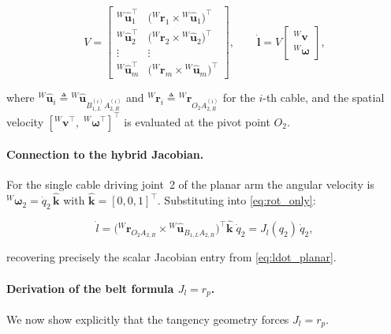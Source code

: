\documentclass[12pt, a4paper]{article}
\theoremstyle{definition}
\begin{document}
\begin{equation}
  \label{eq:structure_matrix}
  \boxed{
  V
  =
  \begin{bmatrix}
    {}^{W}\hat{\mathbf{u}}_1^\top &
    \bigl({}^{W}\mathbf{r}_1 \times {}^{W}\hat{\mathbf{u}}_1\bigr)^\top \\[4pt]
    {}^{W}\hat{\mathbf{u}}_2^\top &
    \bigl({}^{W}\mathbf{r}_2 \times {}^{W}\hat{\mathbf{u}}_2\bigr)^\top \\[2pt]
    \vdots & \vdots \\[2pt]
    {}^{W}\hat{\mathbf{u}}_m^\top &
    \bigl({}^{W}\mathbf{r}_m \times {}^{W}\hat{\mathbf{u}}_m\bigr)^\top
  \end{bmatrix},
  \qquad
  \dot{\mathbf{l}}
  = V
  \begin{bmatrix}
    {}^{W}\mathbf{v} \\ {}^{W}\boldsymbol{\omega}
  \end{bmatrix},
  }
\end{equation}

\noindent
where ${}^{W}\hat{\mathbf{u}}_i \triangleq {}^{W}\hat{\mathbf{u}}_{B_{1,L}^{(i)}A_{2,R}^{(i)}}$
and ${}^{W}\mathbf{r}_i \triangleq {}^{W}\mathbf{r}_{O_2 A_{2,R}^{(i)}}$ for the $i$-th
cable, and the spatial velocity $[{}^{W}\mathbf{v}^\top,\;{}^{W}\boldsymbol{\omega}^\top]^\top$
is evaluated at the pivot point $O_2$.

\paragraph{Connection to the hybrid Jacobian.}
For the single cable driving joint~2 of the planar arm the angular velocity is
${}^{W}\boldsymbol{\omega}_2 = \dot{q}_2\,\hat{\mathbf{k}}$ with
$\hat{\mathbf{k}} = [0,0,1]^\top$.
Substituting into \cref{eq:rot_only}:

\begin{equation}
  \dot{l}
  = \bigl({}^{W}\mathbf{r}_{O_2 A_{2,R}}
          \times {}^{W}\hat{\mathbf{u}}_{B_{1,L}A_{2,R}}\bigr)^\top
    \hat{\mathbf{k}}\;\dot{q}_2
  = J_l(q_2)\,\dot{q}_2 ,
\end{equation}

recovering precisely the scalar Jacobian entry from \cref{eq:ldot_planar}.

\paragraph{Derivation of the belt formula $J_l = r_p$.}
We now show explicitly that the tangency geometry forces $J_l = r_p$.
\end{document}
